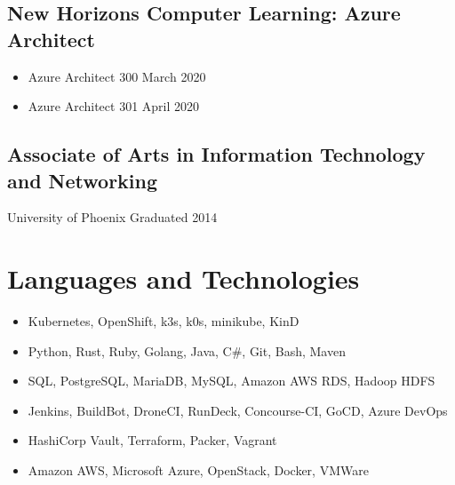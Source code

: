 \documentclass{article}
\begin{document}
    \subsection{New Horizons Computer Learning: Azure Architect}

      \begin{scriptsize}
      \begin{itemize}

          \item Azure Architect 300 \hfill March 2020

          \item Azure Architect 301 \hfill April 2020

      \end{itemize}
      \end{scriptsize}

    \subsection{Associate of Arts in Information Technology and Networking}
      \begin{scriptsize}
      University of Phoenix
      \hfill
      Graduated 2014
      \end{scriptsize}

  \section{Languages and Technologies}

    \begin{scriptsize}
    \begin{itemize}

      \item Kubernetes, OpenShift, k3s, k0s, minikube, KinD

      \item Python, Rust, Ruby, Golang, Java, C\#, Git, Bash, Maven

      \item SQL, PostgreSQL, MariaDB, MySQL, Amazon AWS RDS, Hadoop HDFS

      \item Jenkins, BuildBot, DroneCI, RunDeck, Concourse-CI, GoCD, Azure
        DevOps

      \item HashiCorp Vault, Terraform, Packer, Vagrant

      \item Amazon AWS, Microsoft Azure, OpenStack, Docker, VMWare

    \end{itemize}
    \end{scriptsize}
\end{document}
